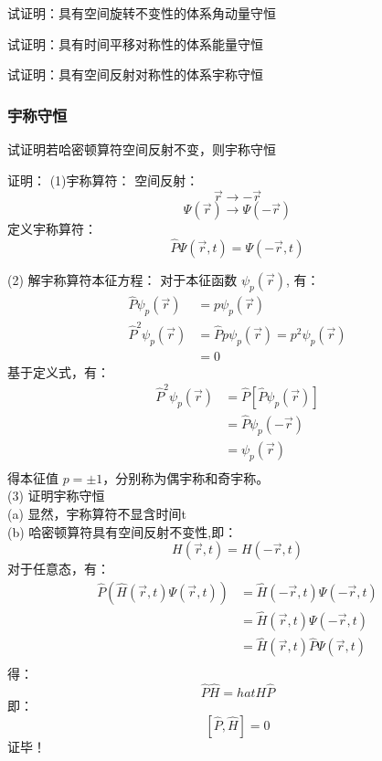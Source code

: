 \begin{frame} [allowframebreaks=]
    \frametitle{} 
    \begin{tcolorbox}[colback=yellow!5,colframe=yellow!75!black,title=角动量守恒：]
        试证明：具有空间旋转不变性的体系角动量守恒                               
    \end{tcolorbox}
    \begin{tcolorbox}[colback=yellow!5,colframe=yellow!75!black,title=能量守恒：]
        试证明：具有时间平移对称性的体系能量守恒                               
    \end{tcolorbox}
    \begin{tcolorbox}[colback=yellow!5,colframe=yellow!75!black,title=宇称守恒：]
        试证明：具有空间反射对称性的体系宇称守恒                             
    \end{tcolorbox}
\end{frame}

\begin{frame} [allowframebreaks=]
    \frametitle{宇称守恒} 
    \begin{tcolorbox}[colback=yellow!5,colframe=yellow!75!black,title=宇称守恒：]
        试证明若哈密顿算符空间反射不变，则宇称守恒                               
    \end{tcolorbox}
    \alert{证明：} (1)宇称算符：
    空间反射：$$\vec{r} \to -\vec{r} $$
    $$\Psi(\vec{r}) \to \Psi(-\vec{r}) $$
    定义宇称算符： $$ \hat{P}\Psi(\vec{r},t) = \Psi(-\vec{r},t) $$
    
    (2) 解宇称算符本征方程： 
    对于本征函数 $\psi_p (\vec{r})$, 有：
    $$\begin{aligned}
        \hat{P}\psi_p (\vec{r}) &= p\psi_p (\vec{r}) \\
        \hat{P}^2\psi_p (\vec{r}) &= \hat{P} p\psi_p (\vec{r}) = p^2\psi_p (\vec{r})\\
        &= 0
    \end{aligned}$$
    基于定义式，有：
    $$\begin{aligned}
        \hat{P}^2\psi_p (\vec{r}) &= \hat{P} [\hat{P} \psi_p (\vec{r})]\\
        &= \hat{P} \psi_p (-\vec{r})\\
        &= \psi_p (\vec{r})\\
    \end{aligned}$$
    得本征值 $p=\pm 1$，分别称为偶宇称和奇宇称。\\
    (3) 证明宇称守恒 \\
    (a) 显然，宇称算符不显含时间t\\
    (b) 哈密顿算符具有空间反射不变性,即：
    $$ H(\vec{r},t)= H(-\vec{r},t)$$
    对于任意态，有：
    $$\begin{aligned}
        \hat{P} (\hat{H}(\vec{r},t) \Psi (\vec{r},t)) &= \hat{H}(-\vec{r},t) \Psi (-\vec{r},t)\\
        &= \hat{H}(\vec{r},t) \Psi (-\vec{r},t)\\
        &= \hat{H}(\vec{r},t) \hat{P} \Psi (\vec{r},t)\\
    \end{aligned}$$
    得： $$ \hat{P} \hat{H} = hat{H} \hat{P} $$
    即：$$[\hat{P}, \hat{H}]=0$$
    证毕！
\end{frame}

